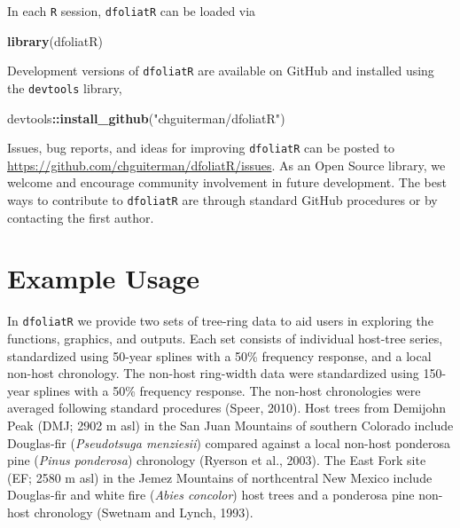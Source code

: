 \documentclass[review]{elsarticle} %
\newenvironment{Shaded}{\begin{snugshade}}{\end{snugshade}}
\newcommand{\KeywordTok}[1]{\textcolor[rgb]{0.13,0.29,0.53}{\textbf{#1}}}
\newcommand{\NormalTok}[1]{#1}
\newcommand{\OperatorTok}[1]{\textcolor[rgb]{0.81,0.36,0.00}{\textbf{#1}}}
\newcommand{\StringTok}[1]{\textcolor[rgb]{0.31,0.60,0.02}{#1}}
\begin{document}
In each \texttt{R} session, \texttt{dfoliatR} can be loaded via

\begin{Shaded}
\begin{Highlighting}[]
\KeywordTok{library}\NormalTok{(dfoliatR)}
\end{Highlighting}
\end{Shaded}

Development versions of \texttt{dfoliatR} are available on GitHub and installed using the \texttt{devtools} library,

\begin{Shaded}
\begin{Highlighting}[]
\NormalTok{devtools}\OperatorTok{::}\KeywordTok{install_github}\NormalTok{(}\StringTok{"chguiterman/dfoliatR"}\NormalTok{)}
\end{Highlighting}
\end{Shaded}

Issues, bug reports, and ideas for improving \texttt{dfoliatR} can be posted to \url{https://github.com/chguiterman/dfoliatR/issues}. As an Open Source library, we welcome and encourage community involvement in future development. The best ways to contribute to \texttt{dfoliatR} are through standard GitHub procedures or by contacting the first author.

\hypertarget{example-usage}{%
\section{Example Usage}\label{example-usage}}

In \texttt{dfoliatR} we provide two sets of tree-ring data to aid users in exploring the functions, graphics, and outputs. Each set consists of individual host-tree series, standardized using 50-year splines with a 50\% frequency response, and a local non-host chronology. The non-host ring-width data were standardized using 150-year splines with a 50\% frequency response. The non-host chronologies were averaged following standard procedures (Speer, 2010). Host trees from Demijohn Peak (DMJ; 2902 m asl) in the San Juan Mountains of southern Colorado include Douglas-fir (\emph{Pseudotsuga menziesii}) compared against a local non-host ponderosa pine (\emph{Pinus ponderosa}) chronology (Ryerson et al., 2003). The East Fork site (EF; 2580 m asl) in the Jemez Mountains of northcentral New Mexico include Douglas-fir and white fire (\emph{Abies concolor}) host trees and a ponderosa pine non-host chronology (Swetnam and Lynch, 1993).
\end{document}
